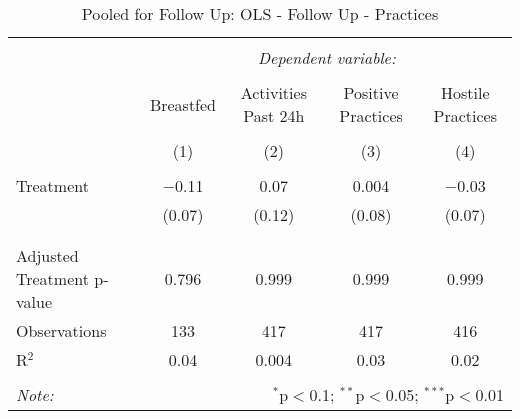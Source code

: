 
\begin{table}[!htbp] \centering 
  \caption{Pooled for Follow Up: OLS - Follow Up - Practices} 
  \label{tbl:Pooled for Follow Up: OLS - Follow Up - Practices} 
\begin{tabular}{@{\extracolsep{5pt}}lcccc} 
\\[-1.8ex]\hline 
\hline \\[-1.8ex] 
 & \multicolumn{4}{c}{\textit{Dependent variable:}} \\ 
\cline{2-5} 
\\[-1.8ex] & Breastfed & Activities Past 24h & Positive Practices & Hostile Practices \\ 
\\[-1.8ex] & (1) & (2) & (3) & (4)\\ 
\hline \\[-1.8ex] 
 Treatment & $-$0.11 & 0.07 & 0.004 & $-$0.03 \\ 
  & (0.07) & (0.12) & (0.08) & (0.07) \\ 
  & & & & \\ 
\hline \\[-1.8ex] 
Adjusted Treatment p-value & 0.796 & 0.999 & 0.999 & 0.999 \\ 
Observations & 133 & 417 & 417 & 416 \\ 
R$^{2}$ & 0.04 & 0.004 & 0.03 & 0.02 \\ 
\hline 
\hline \\[-1.8ex] 
\textit{Note:}  & \multicolumn{4}{r}{$^{*}$p$<$0.1; $^{**}$p$<$0.05; $^{***}$p$<$0.01} \\ 
\end{tabular} 
\end{table} 
